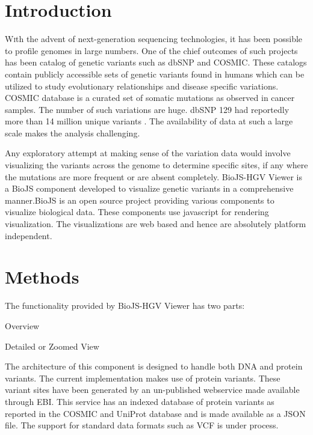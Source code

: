 \documentclass[twoside]{article}
\begin{document}
\begin{multicols}{2} %

\section{Introduction}

\lettrine[nindent=0em,lines=3]{W} 
ith the advent of next-generation sequencing technologies, it has been possible to profile genomes in large numbers. One of the chief outcomes of such projects has been catalog of genetic variants such as dbSNP\cite{Smigielski2000} and COSMIC\cite{Forbes2011}. These catalogs contain publicly accessible sets of genetic variants found in humans which can be utilized to  study evolutionary relationships and disease specific variations. COSMIC database is a curated set of somatic mutations as observed in cancer samples. The number of such variations are   huge. dbSNP 129 had reportedly more than 14 million unique variants \cite{ncbiweb}. The availability of data at such a large scale makes the analysis challenging.

Any exploratory attempt at making sense of the variation data would involve visualizing the variants across the genome to determine specific sites, if any where the mutations are more frequent or are absent completely. 
 BioJS-HGV Viewer is a BioJS \cite{Corpas2014} component developed to visualize genetic variants in a comprehensive manner.BioJS is an open source project providing various components to visualize biological data. These components use javascript for rendering visualization. The visualizations are web based and hence are absolutely platform independent.
 
 

\section{Methods}
The functionality provided by BioJS-HGV Viewer has two parts:\\
\begin{compactitem}
\item Overview
\item Detailed or Zoomed View
\end{compactitem}
The architecture of this component is designed to handle both DNA and protein variants. The current implementation makes use of protein variants. These variant sites have been generated by an un-published webservice made available through EBI. This service has an indexed database of protein variants as reported in the COSMIC and UniProt\cite{Wu2006} database and is made available as a JSON\cite{json} file. The support for standard data formats such as VCF\cite{vcf} is under process.


\end{multicols}
\end{document}
